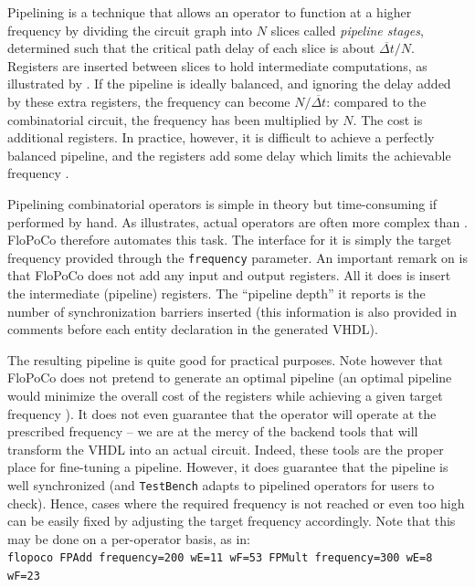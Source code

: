 \documentclass{article}
\begin{document}
Pipelining is a technique that allows an operator to function at a higher frequency by dividing the circuit graph into $N$ slices called \emph{pipeline stages}, determined such that the critical path delay of each slice is about $\overline{\Delta t}/N$.
Registers are inserted between slices to hold intermediate computations, as illustrated by .
If the pipeline is ideally balanced, and ignoring the delay added by these extra registers, the frequency can become $N/\overline{\Delta t}$: compared to the combinatorial circuit, the frequency has been multiplied by $N$.
The cost is additional registers.
In practice, however, it is difficult to achieve a perfectly balanced pipeline, and the registers add some delay which limits the achievable frequency \cite{Hri2002,Sprangle2002}.

Pipelining combinatorial operators is simple in theory but time-consuming if performed by hand.
As  illustrates, actual operators are often more complex than .
FloPoCo therefore automates this task.
The interface for it is simply the target frequency provided through the \texttt{frequency} parameter.
An important remark on  is that FloPoCo does not add any input and output registers.
All it does is insert the intermediate (pipeline) registers.
The ``pipeline depth'' it reports is the number of synchronization barriers inserted (this information is also provided in comments before each entity declaration in the generated VHDL).

The resulting pipeline is quite good for practical purposes.
Note however that FloPoCo  does not pretend to generate an optimal pipeline (an optimal pipeline would minimize the overall cost of the registers while achieving a given target frequency  \cite{LeisersonSaxe1991}).
It does not even guarantee that the operator will operate at the prescribed frequency -- we are at the mercy of the backend tools that will transform the VHDL into an actual circuit.
Indeed,  these tools are the proper place for fine-tuning a pipeline.
However, it does guarantee that the pipeline is well synchronized (and \texttt{TestBench} adapts to pipelined operators for users to check).
Hence, cases where the required frequency is not reached or even too high can be easily fixed by adjusting the target frequency accordingly.
Note that this may be done on a per-operator basis, as in:\\
		 \texttt{flopoco  FPAdd frequency=200 wE=11 wF=53 FPMult frequency=300 wE=8 wF=23}
\end{document}
